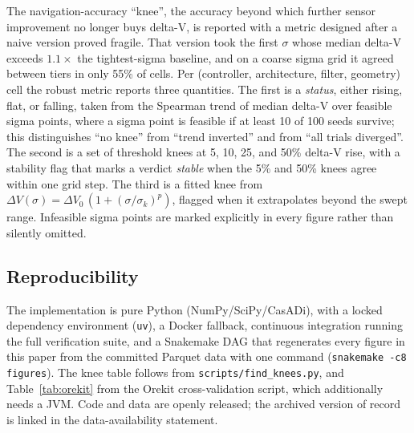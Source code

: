 The navigation-accuracy ``knee'', the accuracy beyond which further sensor
improvement no longer buys delta-V, is reported with a metric designed after
a naive version proved fragile. That version took the first $\sigma$ whose
median delta-V exceeds $1.1\times$ the tightest-sigma baseline, and on a
coarse sigma grid it agreed between tiers in only 55\% of cells. Per
(controller, architecture, filter, geometry) cell the robust metric reports
three quantities. The first is a \emph{status}, either rising, flat, or
falling, taken from the Spearman trend of median delta-V over feasible sigma
points, where a sigma point is feasible if at least 10 of 100 seeds survive;
this distinguishes ``no knee'' from ``trend inverted'' and from ``all trials
diverged''. The second is a set of threshold knees at 5, 10, 25, and 50\%
delta-V
rise, with a stability flag that marks a verdict \emph{stable} when the 5\%
and 50\% knees agree within one grid step. The
third is a fitted knee from
$\Delta V(\sigma) = \Delta V_0\,(1 + (\sigma/\sigma_k)^p)$, flagged when it
extrapolates beyond the swept range. Infeasible sigma points are marked
explicitly in every figure rather than silently omitted.

\subsection{Reproducibility}

The implementation is pure Python (NumPy/SciPy/CasADi), with a locked
dependency environment (\texttt{uv}), a Docker fallback, continuous
integration running the full verification suite, and a Snakemake DAG that
regenerates every figure in this paper from the committed Parquet data with
one command (\texttt{snakemake -c8 figures}). The knee table follows from
\texttt{scripts/find\_knees.py}, and Table~\ref{tab:orekit} from the
Orekit cross-validation script, which additionally needs a JVM. Code and
data are openly released; the archived version of record is linked in the
data-availability statement.
